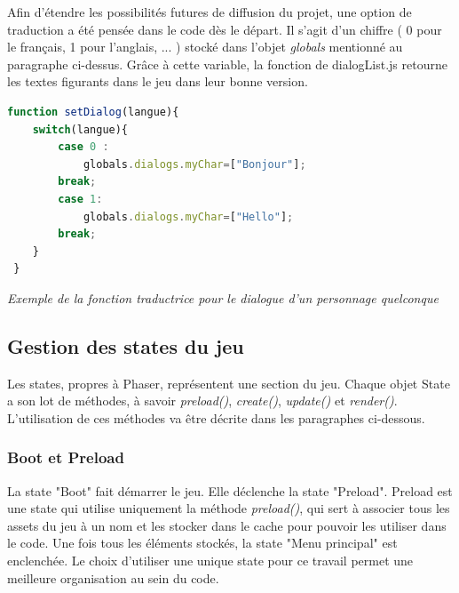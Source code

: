 \documentclass[11pt]{article}
\begin{document}
\begin{appendices}
 Afin d'étendre les possibilités futures de diffusion du projet, une option de traduction a été pensée dans le code dès le départ. Il s'agit d'un chiffre ( 0 pour le français, 1 pour l'anglais, ... ) stocké dans l'objet \textit{globals} mentionné au paragraphe ci-dessus. Grâce à cette variable, la fonction de dialogList.js retourne les textes figurants dans le jeu dans leur bonne version. \\
 \begin{lstlisting}[language=JavaScript]
 function setDialog(langue){
    switch(langue){
        case 0 : 
        	globals.dialogs.myChar=["Bonjour"];
    	break;
        case 1:
        	globals.dialogs.myChar=["Hello"];
		break;
 	}
 }
\end{lstlisting}
\textit{Exemple de la fonction traductrice pour le dialogue d'un personnage quelconque}

\subsection{Gestion des states du jeu}
Les states, propres à Phaser, représentent une section du jeu. Chaque objet State a son lot de méthodes, à savoir \textit{preload()}, \textit{create()}, \textit{update()} et \textit{render()}. L'utilisation de ces méthodes va être décrite dans les paragraphes ci-dessous.

\subsubsection{Boot et Preload}
La state "Boot" fait démarrer le jeu. Elle déclenche la state "Preload". Preload est une state qui utilise uniquement la méthode \textit{preload()}, qui sert à associer tous les assets du jeu à un nom et les stocker dans le cache pour pouvoir les utiliser dans le code. Une fois tous les éléments stockés, la state "Menu principal" est enclenchée. Le choix d'utiliser une unique state pour ce travail permet une meilleure organisation au sein du code.

\end{appendices}
\end{document}
